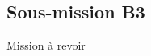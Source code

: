 \subsection{Sous-mission B3}

\begin{center}
\vspace{\fill}
{\Huge\color{red}Mission à revoir}
\vspace{\fill}
\end{center}